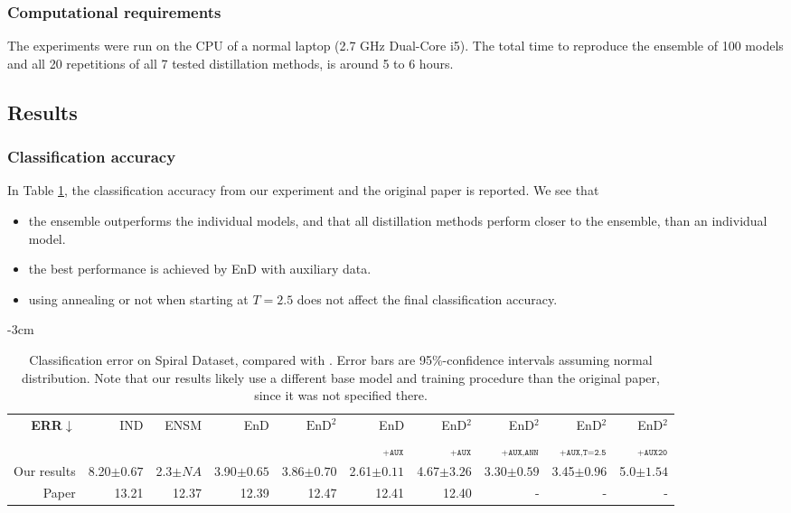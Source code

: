 \subsubsection{Computational requirements}
The experiments were run on the CPU of a normal laptop (2.7 GHz Dual-Core i5). The total time to reproduce the ensemble of 100 models and all 20 repetitions of all 7 tested distillation methods, is around 5 to 6 hours.

\subsection{Results}


\subsubsection{Classification accuracy}
In Table \ref{tab:spiral}, the classification accuracy from our experiment and the original paper is reported. We see that 
\begin{itemize}
    \item the ensemble outperforms the individual models, and that all distillation methods perform closer to the ensemble, than an individual model.
    \item the best performance is achieved by EnD with auxiliary data. 
    \item using annealing or not when starting at $T = 2.5$ does not affect the final classification accuracy. 
\end{itemize}

\begin{table}
  \centering
  \caption{Classification error on Spiral Dataset, compared with \cite{malinin2019ensemble}. Error bars are 95\%-confidence intervals assuming normal distribution. Note that our results likely use a different base model and training procedure than the original paper, since it was not specified there.  }
  \addtolength{\leftskip} {-3cm}
  \addtolength{\rightskip}{-3cm}
  \begin{tabular}{r||r|r|r|r|r|r|r|r|r} 
  \hline
  \textbf{ERR$\downarrow$} & 
  IND & 
  ENSM & 
  EnD & 
  $\text{EnD}^2$ & 
  EnD & 
  EnD$^2$ & 
  EnD$^2$ & 
  EnD$^2$ & 
  EnD$^2$   \\[-7pt]
  & 
  & 
  & 
  & 
  & 
  $_{\texttt{+AUX}}$ & 
  $_{\texttt{+AUX}}$ & 
  $_{\texttt{+AUX,ANN}}$ & 
  $_{\texttt{+AUX,T=2.5}}$ & 
  $_{\texttt{+AUX20}}$ \\
  \hline
  \hline
  Our results & 
  8.20$\scriptstyle \pm 0.67$ &
  2.3$\scriptstyle \pm NA$ &
  3.90$\scriptstyle \pm 0.65$&
  3.86$\scriptstyle \pm 0.70$&
  2.61$\scriptstyle \pm 0.11$&
  4.67$\scriptstyle \pm 3.26$&
  3.30$\scriptstyle \pm 0.59$&
  3.45$\scriptstyle \pm 0.96$&
  5.0$\scriptstyle \pm 1.54$ \\ 
  Paper \cite{malinin2019ensemble} &
  13.21 &
  12.37 &
  12.39 &
  12.47 &
  12.41 &
  12.40 &
  - &
  - &
  -\\ 
  \hline
  \end{tabular}
  \\ [1ex] 
   
  \label{tab:spiral}
  \end{table}

